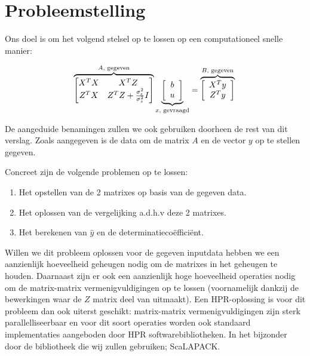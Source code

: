 \documentclass[a4paper,12pt]{report}
\begin{document}


\section{Probleemstelling}

Ons doel is om het volgend stelsel op te lossen op een computationeel snelle manier:

\begin{equation*}
\overbrace{\begin{bmatrix} X^TX & X^TZ \\ Z^TX & Z^TZ+\frac{\sigma_e^2}{\sigma_s^2}I \end{bmatrix}}^{\text{$A$, gegeven}} \underbrace{ \left[ \begin{array}{c} b \\ u \end{array} \right]}_{\text{$x$, gevraagd}} =  \overbrace{\left[ \begin{array}{c} X^Ty \\ Z^Ty \end{array} \right]}^{\text{$B$, gegeven}} \\
\end{equation*}

De aangeduide benamingen zullen we ook gebruiken doorheen de rest van dit verslag. Zoals aangegeven is de data om de matrix $A$ en de vector $y$ op te stellen gegeven.

Concreet zijn de volgende problemen op te lossen:
\begin{enumerate}
\item Het opstellen van de 2 matrixes op basis van de gegeven data.
\item Het oplossen van de vergelijking a.d.h.v deze 2 matrixes.
\item Het berekenen van $\hat{y}$ en de determinatieco\"effici\"ent.
\end{enumerate}

Willen we dit probleem oplossen voor de gegeven inputdata hebben we een aanzienlijk hoeveelheid geheugen nodig om de matrixes in het geheugen te houden. Daarnaast zijn er ook een aanzienlijk hoge hoeveelheid operaties nodig om de matrix-matrix vermenigvuldigingen op te lossen (voornamelijk dankzij de bewerkingen waar de $Z$ matrix deel van uitmaakt).
Een HPR-oplossing is voor dit probleem dan ook uiterst geschikt: matrix-matrix vermenigvuldigingen zijn sterk parallelliseerbaar en voor dit soort operaties worden ook standaard implementaties aangeboden door HPR softwarebibliotheken. In het bijzonder door de bibliotheek die wij zullen gebruiken; ScaLAPACK. 
\end{document}
